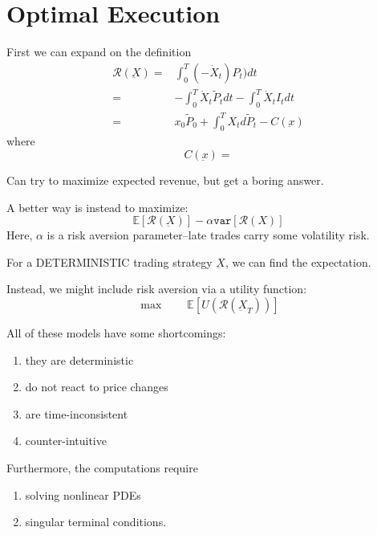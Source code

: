 \section{Optimal Execution}
First we can expand on the definition
\begin{align}
	\mathcal{R}(\underbar{X}) =& \int_0^T (-\dot{X}_t)P_t) dt\\
	=& -\int_0^T \dot{X}_t\tilde{P}_tdt - \int_0^T \dot{X}_tI_t dt\\
	=& x_0\tilde{P}_0 + \int_0^T X_t d\tilde{P}_t - C(\underbar{x})
\end{align}
where
\begin{equation}
	C(\underbar{x}) = 
\end{equation}

Can try to maximize expected revenue, but get a boring answer.

A better way is instead to maximize:
\begin{equation}
	\mathbb{E}\left[ \mathcal{R}(\underbar{X})\right] - \alpha \texttt{var}\left[ \mathcal{R}(X) \right]
\end{equation}
Here, $\alpha$ is a risk aversion parameter--late trades carry some volatility risk.

For a DETERMINISTIC trading strategy $\underbar{X}$, we can find the expectation.


Instead, we might include risk aversion via a utility function:
\begin{equation}
	\max \qquad \mathbb{E}\left[ U(\mathcal{R}(\underbar{X}_T ))\right]
\end{equation}


All of these models have some shortcomings:
\begin{enumerate}
	\item they are deterministic
	\item do not react to price changes
	\item are time-inconsistent
	\item counter-intuitive
\end{enumerate}
Furthermore, the computations require
\begin{enumerate}
	\item solving nonlinear PDEs
	\item singular terminal conditions.
\end{enumerate}

